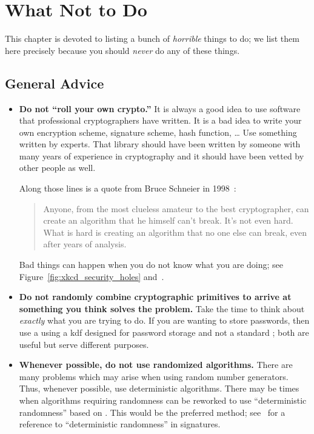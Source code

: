 \chapter{What Not to Do}
\label{chap:do_not}

This chapter is devoted to listing a bunch of \emph{horrible}
things to do;
we list them here precisely because you should \emph{never}
do any of these things.

\section{General Advice}

\begin{itemize}
\item \textbf{Do not ``roll your own crypto.''}
    It is always a good idea to use software that professional cryptographers
        have written.
    It is a bad idea to write your own \gls{encryption scheme},
        \gls{signature} scheme,
        \gls{hash function}, \dots
    Use something written by experts.
    That library should have been written by someone with many years
        of experience in cryptography and it should have been vetted
        by other people as well.

    Along those lines is a quote from Bruce Schneier
    in 1998~\cite{SchneierBlog1998}:

\begin{quote}
    Anyone, from the most clueless amateur to the best cryptographer,
    can create an algorithm that he himself can't break.
    It's not even hard. What is hard is creating an algorithm
    that no one else can break, even after years of analysis.
\end{quote}

    Bad things can happen when you do not know what you are doing;
    see Figure~\ref{fig:xkcd_security_holes} and~\cite{SchneierBlog2008}.



\item \textbf{Do not randomly combine cryptographic primitives
    to arrive at something you think solves the problem.}
    Take the time to think about \emph{exactly} what you are trying to do.
    If you are wanting to store passwords,
    then use a using a \gls{kdf} designed
    for password storage
    and not a standard ;
    both are useful but serve different purposes.

\item \textbf{Whenever possible, do not use randomized algorithms.}
    There are many problems which may arise when using
        random number generators.
    Thus, whenever possible, use deterministic algorithms.
    There may be times when algorithms requiring randomness
    can be reworked to use ``deterministic randomness'' based on
    .
    This would be the preferred method;
    see~\cite{rfc6979} for a reference to ``deterministic randomness''
    in \glspl{signature}.


\end{itemize}
